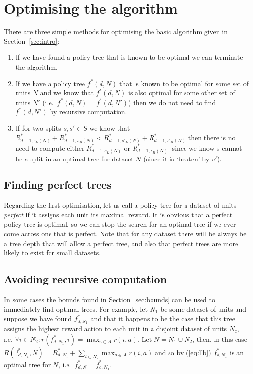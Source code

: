 \documentclass{article}
\begin{document}
\section{Optimising the algorithm}
\label{sec:optimising}

There are three simple methods for optimising the basic algorithm
given in Section~\ref{sec:intro}:
\begin{enumerate}
\item If we have found a policy tree that is known to be optimal we
  can terminate the algorithm.
\item If we have a policy tree $f^{*}(d,N)$ that is known to be
  optimal for some set of units $N$ and we know that $f^{*}(d,N)$ is
  also optimal for some other set of units $N'$ (i.e.\  $f^{*}(d,N) =
  f^{*}(d,N')$) then we do not need to find $f^{*}(d,N')$ by recursive
  computation.
\item If for two splits $s, s' \in S$ we know that $R^{*}_{d-1,s_{L}(N)} + R^{*}_{d-1,s_{R}(N)} 
  < R^{*}_{d-1,s'_{L}(N)} + R^{*}_{d-1,s'_{R}(N)}$ then there is no
  need to compute either  $R^{*}_{d-1,s_{L}(N)}$ or
  $R^{*}_{d-1,s_{R}(N)}$, since we know $s$ cannot be a split in an
  optimal tree for dataset $N$ (since it is `beaten' by $s'$).
\end{enumerate}

\subsection{Finding perfect trees}
\label{sec:perfect}

Regarding the first optimisation, let us call a policy tree for a
dataset of units \emph{perfect} if it assigns each unit its maximal
reward. It is obvious that a perfect policy tree is optimal, so we can
stop the search for an optimal tree if we ever come across one that is
perfect. Note that for any dataset there will be always be a tree
depth that will allow a perfect tree, and also that perfect trees are
more likely to exist for small datasets.

\subsection{Avoiding recursive computation}
\label{sec:avoiding}

In some cases the bounds found in Section~\ref{sec:bounds} can be used
to immediately find optimal trees. For example, let $N_1$ be some
dataset of units and suppose we have found $f^{*}_{d,N_{1}}$ and that
it happens to be the case that this tree assigns the highest reward
action to each unit in a disjoint dataset of units $N_2$, i.e.
$\forall i \in N_{2} : r(f^{*}_{d,N_{1}},i) = \max_{a \in A}
r(i,a)$. Let $N = N_{1} \dot\cup N_{2}$, then, in this case
$R(f^{*}_{d,N_{1}},N) = R^{*}_{d,N_{1}} + \sum_{i \in N_{2}} \max_{a
  \in A} r(i,a)$ and so by (\ref{eq:llb}) $f^{*}_{d,N_{1}}$ is an
optimal tree for $N$, i.e.\ $f^{*}_{d,N} = f^{*}_{d,N_{1}}$.
\end{document}
